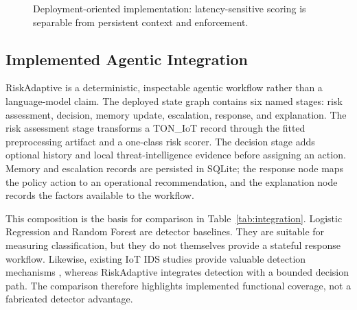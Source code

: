 \documentclass[conference]{IEEEtran}
\begin{document}
\begin{figure}[!t]
\centering
{}
\caption{Deployment-oriented implementation: latency-sensitive scoring is separable from persistent context and enforcement.}
\label{fig:deployment}
\end{figure}

\subsection{Implemented Agentic Integration}
RiskAdaptive is a deterministic, inspectable agentic workflow rather than a language-model claim. The deployed state graph contains six named stages: risk assessment, decision, memory update, escalation, response, and explanation. The risk assessment stage transforms a TON\_IoT record through the fitted preprocessing artifact and a one-class risk scorer. The decision stage adds optional history and local threat-intelligence evidence before assigning an action. Memory and escalation records are persisted in SQLite; the response node maps the policy action to an operational recommendation, and the explanation node records the factors available to the workflow.

This composition is the basis for comparison in Table~\ref{tab:integration}. Logistic Regression and Random Forest are detector baselines. They are suitable for measuring classification, but they do not themselves provide a stateful response workflow. Likewise, existing IoT IDS studies provide valuable detection mechanisms \cite{diro2018,mirsky2018,shone2018,vinayakumar2019}, whereas RiskAdaptive integrates detection with a bounded decision path. The comparison therefore highlights implemented functional coverage, not a fabricated detector advantage.
\end{document}
